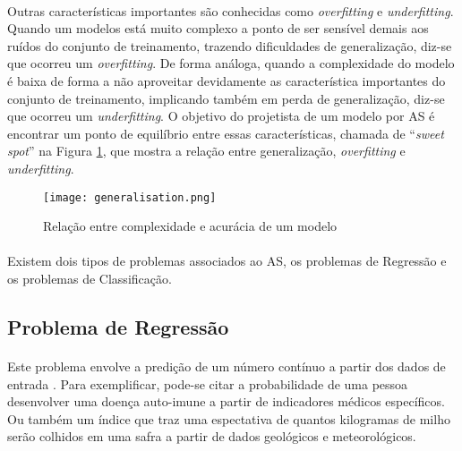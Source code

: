 \paragraph{} Outras características importantes são conhecidas como \textit{overfitting} e \textit{underfitting}. Quando um modelos está muito complexo a ponto de ser sensível demais aos ruídos do conjunto de treinamento, trazendo dificuldades de generalização, diz-se que ocorreu um \textit{overfitting}. De forma análoga, quando a complexidade do modelo é baixa de forma a não aproveitar devidamente as característica importantes do conjunto de treinamento, implicando também em perda de generalização, diz-se que ocorreu um \textit{underfitting}. O objetivo do projetista de um modelo por AS é encontrar um ponto de equilíbrio entre essas características, chamada de ``\textit{sweet spot}'' na Figura \ref{fig:6}, que mostra a relação entre generalização, \textit{overfitting} e \textit{underfitting}.

\begin{figure}[h]
    \texttt{[image: generalisation.png]}
    \centering
    \caption{Relação entre complexidade e acur\'acia de um modelo \cite{muller2016introduction}}
    \label{fig:6}
\end{figure}

\paragraph{} Existem dois tipos de problemas associados ao AS, os problemas de Regressão e os problemas de Classificação.



\FloatBarrier
\subsection{Problema de Regressão}

\paragraph{} Este problema envolve a predição de um número contínuo a partir dos dados de entrada \cite{muller2016introduction}. Para exemplificar, pode-se citar a probabilidade de uma pessoa desenvolver uma doença auto-imune a partir de indicadores médicos específicos. Ou também um índice que traz uma espectativa de quantos kilogramas de milho serão colhidos em uma safra a partir de dados geológicos e meteorológicos.



